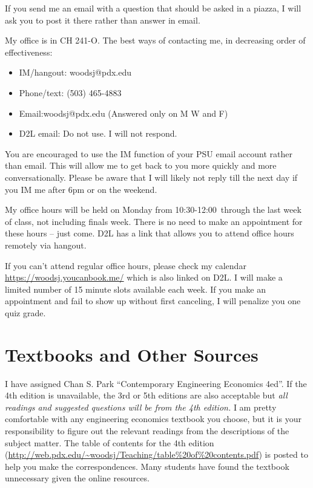 \documentclass[letterpaper,10pt]{article}
\newcommand{\Office}{on Monday from 10:30-12:00}
\begin{document}
If you send me an email with a question that should be asked in a piazza, I
will ask you to post it there rather than answer in email.


 
My office is in CH 241-O.  The best ways of contacting me, in
decreasing order of effectiveness:
\begin{itemize}
\item IM/hangout: woodsj@pdx.edu
\item Phone/text: (503) 465-4883
\item Email:woodsj@pdx.edu (Answered only on M W and F)
\item D2L email: Do not use.  I will not respond.
\end{itemize}

You are encouraged to use the IM function of your PSU email account rather than email. This will allow me to get back to you more quickly and more conversationally. Please be aware that I will likely not reply till the next day if you IM me after 6pm or on the weekend.  

My office hours will be held \Office ~through the last week of class, not including finals week. There is no need to make an appointment for these hours -- just come.  D2L has a link that allows you to attend office hours remotely via hangout.



If you can’t attend regular office hours, please check my calendar \url{https://woodsj.youcanbook.me/} which is also linked on D2L. I will make a limited number of 15 minute slots available each week. If you make an appointment and fail to show up without first canceling, I will penalize you one quiz grade.  



\section{Textbooks and Other Sources}
I have assigned Chan S. Park ``Contemporary Engineering Economics
4ed''.  If the 4th edition is unavailable, the 3rd or 5th editions are also
acceptable but \emph{all readings and suggested questions will be from
  the 4th edition.} I am pretty comfortable with any engineering
economics textbook you choose, but it is your responsibility to figure
out the relevant readings from the descriptions of the subject matter.
The table of contents for the 4th edition (\url{http://web.pdx.edu/~woodsj/Teaching/table\%20of\%20contents.pdf}) is posted to help you
make the correspondences.  Many students have found the textbook unnecessary given the online resources.
\end{document}
